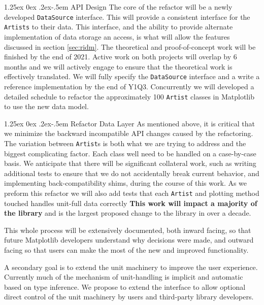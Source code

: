 \documentclass[12pt]{article}
\makeatletter
\numberwithin{page}{section}
\renewcommand{\paragraph}{%
  \@startsection{paragraph}{4}%
  {\z@}{1.25ex \@plus 0ex \@minus .2ex}{-.5em}%
  {\normalfont\normalsize\itshape\bfseries}%
}
\makeatother
\begin{document}
\paragraph{API Design} The core of the refactor will be a newly developed \texttt{DataSource}
interface.  This will provide a consistent interface for the
\texttt{Artists} to their data.  This interface, and the ability to
provide alternate implementation of data storage an access, is what
will allow the features discussed in section \ref{sec:ridm}.  The
theoretical and proof-of-concept work will be finished by the end of
2021.  Active work on both projects will overlap by 6 months and we
will actively engage to ensure that the theoretical work is
effectively translated.  We will fully specify the \texttt{DataSource}
interface and a write a reference implementation by the end of Y1Q3.
Concurrently we will developed a detailed schedule to refactor the
approximately 100 \texttt{Artist} classes in Matplotlib to use the new
data model.

\paragraph{Refactor Data Layer} As mentioned above, it is critical that we minimize the backward
incompatible API changes caused by the refactoring.  The variation
between \texttt{Artist}s is both what we are trying to address and the
biggest complicating factor.  Each class well need to be handled on a
case-by-case basis.  We anticipate that there will be significant
collateral work, such as writing additional tests to ensure that we do
not accidentally break current behavior, and implementing
back-compatibility shims, during the course of this work.  As we
preform this refactor we will also add tests that each \texttt{Artist}
and plotting method touched handles unit-full data correctly
\textbf{This work will impact a majority of the library} and is the
largest proposed change to the library in over a decade.

This whole process will be extensively documented, both inward facing,
so that future Matplotlib developers understand why decisions were
made, and outward facing so that users can make the most of the new
and improved functionality.



A secondary goal is to extend the unit machinery to improve the user
experience.  Currently much of the mechanism of unit-handling is
implicit and automatic based on type inference.  We propose to extend
the interface to allow optional direct control of the unit machinery
by users and third-party library developers.
\end{document}
